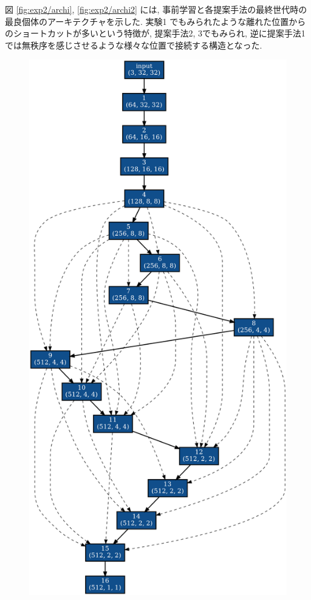 図 \ref{fig:exp2/archi}, \ref{fig:exp2/archi2} には,
事前学習と各提案手法の最終世代時の最良個体のアーキテクチャを示した.
実験1 でもみられたような離れた位置からのショートカットが多いという特徴が, 提案手法2, 3でもみられ,
逆に提案手法1 では無秩序を感じさせるような様々な位置で接続する構造となった.


\begin{figure}[tb]
 \begin{minipage}{0.49\hsize}
 	\begin{center}
    \includegraphics[clip,scale=0.2]{./fig/04.exp/base.png}\\

\end{center}
\end{minipage}
\end{figure}
